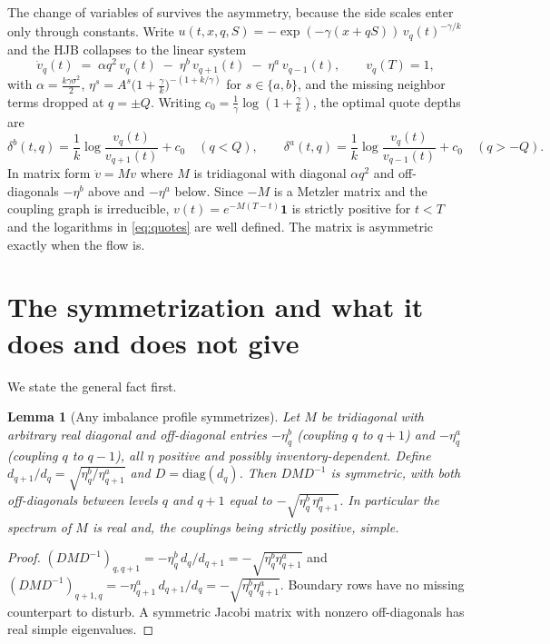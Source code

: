 \documentclass[11pt]{article}
\newtheorem{lemma}{Lemma}
\begin{document}
The change of variables of \citet{glft2012} survives the asymmetry, because the side scales enter only through constants. Write $u(t,x,q,S) = -\exp(-\gamma(x+qS))\, v_q(t)^{-\gamma/k}$ and the HJB collapses to the linear system
\begin{equation}\label{eq:system}
\dot v_q(t) \;=\; \alpha q^2\, v_q(t) \;-\; \eta^b\, v_{q+1}(t) \;-\; \eta^a\, v_{q-1}(t),
\qquad v_q(T) = 1,
\end{equation}
with $\alpha = \tfrac{k\gamma\sigma^2}{2}$, $\eta^s = A^s\big(1+\tfrac{\gamma}{k}\big)^{-(1+k/\gamma)}$ for $s \in \{a,b\}$, and the missing neighbor terms dropped at $q = \pm Q$. Writing $c_0 = \tfrac{1}{\gamma}\log(1+\tfrac{\gamma}{k})$, the optimal quote depths are
\begin{equation}\label{eq:quotes}
\delta^b(t,q) = \frac{1}{k}\log\frac{v_q(t)}{v_{q+1}(t)} + c_0 \quad (q < Q),
\qquad
\delta^a(t,q) = \frac{1}{k}\log\frac{v_q(t)}{v_{q-1}(t)} + c_0 \quad (q > -Q).
\end{equation}
In matrix form $\dot v = Mv$ where $M$ is tridiagonal with diagonal $\alpha q^2$ and off-diagonals $-\eta^b$ above and $-\eta^a$ below. Since $-M$ is a Metzler matrix and the coupling graph is irreducible, $v(t) = e^{-M(T-t)}\mathbf{1}$ is strictly positive for $t < T$ and the logarithms in \eqref{eq:quotes} are well defined. The matrix is asymmetric exactly when the flow is.

\section{The symmetrization and what it does and does not give}\label{sec:theorem}

We state the general fact first.

\begin{lemma}[Any imbalance profile symmetrizes]\label{lem:general}
Let $M$ be tridiagonal with arbitrary real diagonal and off-diagonal entries $-\eta^b_q$ (coupling $q$ to $q+1$) and $-\eta^a_q$ (coupling $q$ to $q-1$), all $\eta$ positive and possibly inventory-dependent. Define $d_{q+1}/d_q = \sqrt{\eta^b_q/\eta^a_{q+1}}$ and $D = \mathrm{diag}(d_q)$. Then $DMD^{-1}$ is symmetric, with both off-diagonals between levels $q$ and $q+1$ equal to $-\sqrt{\eta^b_q\, \eta^a_{q+1}}$. In particular the spectrum of $M$ is real and, the couplings being strictly positive, simple.
\end{lemma}

\begin{proof}
$(DMD^{-1})_{q,q+1} = -\eta^b_q\, d_q/d_{q+1} = -\sqrt{\eta^b_q \eta^a_{q+1}}$ and $(DMD^{-1})_{q+1,q} = -\eta^a_{q+1}\, d_{q+1}/d_q = -\sqrt{\eta^b_q \eta^a_{q+1}}$. Boundary rows have no missing counterpart to disturb. A symmetric Jacobi matrix with nonzero off-diagonals has real simple eigenvalues.
\end{proof}
\end{document}

